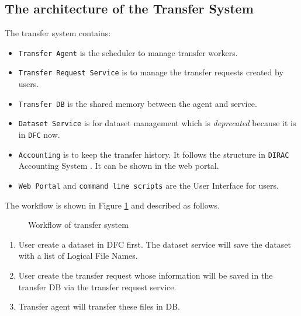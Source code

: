 \subsection{The architecture of the Transfer System}

The transfer system contains:

\begin{itemize}
    \item {\tt Transfer Agent} is the scheduler to manage transfer workers.
    \item {\tt Transfer Request Service} is to manage the transfer requests
          created by users.
    \item {\tt Transfer DB} is the shared memory between the agent and 
          service. 
    \item {\tt Dataset Service} is for dataset management which is 
          {\em deprecated} because it is in {\tt DFC} now.
    \item {\tt Accounting} is to keep the transfer history.
          It follows the structure in {\tt DIRAC} Accounting System
          \cite{bib:diracacct}.
          It can be shown in the web portal.
    \item {\tt Web Portal} and {\tt command line scripts} are the 
          User Interface for users.
\end{itemize}

The workflow is shown in Figure \ref{fig:workflow} and described as follows.
\begin{figure}[htbp]
    
    \caption{Workflow of transfer system} \label{fig:workflow}
\end{figure}

\begin{enumerate}
\item User create a dataset in DFC first. The dataset service
    will save the dataset with a list of Logical File Names.
\item User create the transfer request
whose information will be saved in the transfer DB via
the transfer request service.
\item Transfer agent will transfer these files in DB.
\end{enumerate}

